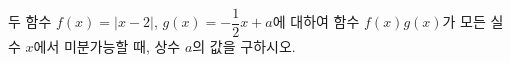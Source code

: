 두 함수 $f(x)=|x-2|$, $g(x)=-\dfrac{1}{2}x+a$에 대하여 함수 $f(x)g(x)$가 모든 실수 $x$에서 미분가능할 때, 상수 $a$의 값을 구하시오.
